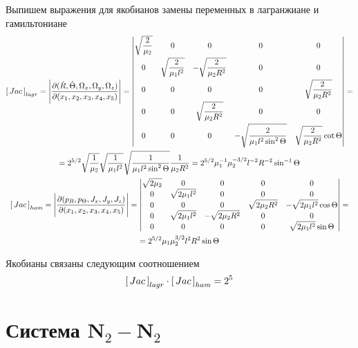 \documentclass[12pt]{article}
\newcommand{\dR}{\dot{R}}
\newcommand{\dT}{\dot{\Theta}}
\newcommand{\pT}{p_\Theta}
\newcommand{\JacL}{\left[ \, Jac \, \right]_{lagr}}
\newcommand{\JacH}{\left[ \, Jac \, \right]_{ham}}
\begin{document}
Выпишем выражения для якобианов замены переменных в лагранжиане и гамильтониане
\begin{gather}
	\JacL = \Bigg{|} \frac{\partial (\dR, \dT, \Omega_x, \Omega_y, \Omega_z )}{\partial (x_1, x_2, x_3, x_4, x_5)} \Bigg{|} =
	\begin{vmatrix}
			\displaystyle \sqrt{\frac{2}{\mu_2}} & 0 & 0 & 0 & 0 \\[2ex]
			0 & \displaystyle \sqrt{\frac{2}{\mu_1 l^2}} & -\displaystyle \sqrt{\frac{2}{\mu_2 R^2}} & 0 & 0 \\[2ex]
			0 & 0 & 0 & 0 & \displaystyle \sqrt{\frac{2}{\mu_2 R^2}} \\[2ex]
			0 & 0 & \displaystyle \sqrt{\frac{2}{\mu_2 R^2}} & 0 & 0 \\[2ex]
		0 & 0 & 0 & -\displaystyle \sqrt{\frac{2}{\mu_1 l^2 \sin^2 \Theta}} & \displaystyle \sqrt{\frac{2}{\mu_2 R^2}} \cot \Theta 
	\end{vmatrix} = \notag \\
	= 2^{5/2} \displaystyle \sqrt{\frac{1}{\mu_2}} \sqrt{\frac{1}{\mu_1 l^2}} \sqrt{\frac{1}{\mu_1 l^2 \sin^2 \Theta}} \frac{1}{\mu_2 R^2} = 2^{5/2} \mu_1^{-1} \mu_2^{-3/2} l^{-2} R^{-2} \sin^{-1} \Theta \notag \\
	\JacH = \Bigg{|} \frac{\partial (p_R, \pT, J_x, J_y, J_z)}{\partial (x_1, x_2, x_3, x_4, x_5)} \Bigg{|} = 
	\begin{vmatrix}
		\displaystyle \sqrt{2 \mu_2} & 0 & 0 & 0 & 0 \\
		0 & \displaystyle \sqrt{2 \mu_1 l^2} & 0 & 0 & 0 \\
		0 & 0 & 0 & \displaystyle \sqrt{2 \mu_2 R^2} & - \displaystyle \sqrt{2 \mu_1 l^2} \cos \Theta \\
		0 & \displaystyle \sqrt{2 \mu_1 l^2} & - \displaystyle \sqrt{2 \mu_2 R^2} & 0 & 0 \\
		0 & 0 & 0 & 0 & \displaystyle \sqrt{2 \mu_1 l^2} \sin \Theta 
	\end{vmatrix} = \notag \\
	= 2^{5/2} \mu_1 \mu_2^{3/2} l^2 R^2 \sin \Theta \notag
\end{gather}

Якобианы связаны следующим соотношением
\begin{gather}
	\JacL \cdot \JacH = 2^5 \notag
\end{gather}

\section{Система N$_2-$N$_2$}
\end{document}

